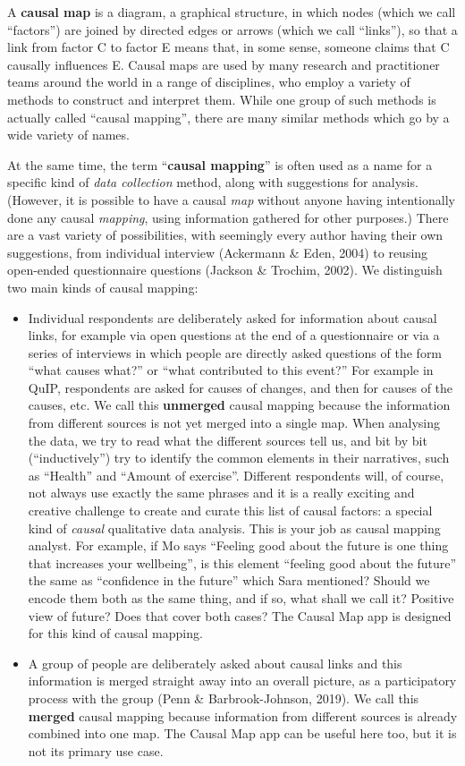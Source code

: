 \documentclass[
]{book}
\begin{document}
A \textbf{causal map} is a diagram, a graphical structure, in which nodes (which we call ``factors'') are joined by directed edges or arrows (which we call ``links''), so that a link from factor C to factor E means that, in some sense, someone claims that C causally influences E. Causal maps are used by many research and practitioner teams around the world in a range of disciplines, who employ a variety of methods to construct and interpret them. While one group of such methods is actually called ``causal mapping'', there are many similar methods which go by a wide variety of names.

At the same time, the term ``\textbf{causal mapping}'' is often used as a name for a specific kind of \emph{data collection} method, along with suggestions for analysis. (However, it is possible to have a causal \emph{map} without anyone having intentionally done any causal \emph{mapping}, using information gathered for other purposes.) There are a vast variety of possibilities, with seemingly every author having their own suggestions, from individual interview (Ackermann \& Eden, 2004) to reusing open-ended questionnaire questions (Jackson \& Trochim, 2002). We distinguish two main kinds of causal mapping:

\begin{itemize}
\item
  Individual respondents are deliberately asked for information about causal links, for example via open questions at the end of a questionnaire or via a series of interviews in which people are directly asked questions of the form ``what causes what?'' or ``what contributed to this event?'' For example in QuIP, respondents are asked for causes of changes, and then for causes of the causes, etc. We call this \textbf{unmerged} causal mapping because the information from different sources is not yet merged into a single map. When analysing the data, we try to read what the different sources tell us, and bit by bit (``inductively'') try to identify the common elements in their narratives, such as ``Health'' and ``Amount of exercise''. Different respondents will, of course, not always use exactly the same phrases and it is a really exciting and creative challenge to create and curate this list of causal factors: a special kind of \emph{causal} qualitative data analysis. This is your job as causal mapping analyst. For example, if Mo says ``Feeling good about the future is one thing that increases your wellbeing'', is this element ``feeling good about the future'' the same as ``confidence in the future'' which Sara mentioned? Should we encode them both as the same thing, and if so, what shall we call it? Positive view of future? Does that cover both cases? The Causal Map app is designed for this kind of causal mapping.
\item
  A group of people are deliberately asked about causal links and this information is merged straight away into an overall picture, as a participatory process with the group (Penn \& Barbrook-Johnson, 2019). We call this \textbf{merged} causal mapping because information from different sources is already combined into one map. The Causal Map app can be useful here too, but it is not its primary use case.
\end{itemize}
\end{document}
